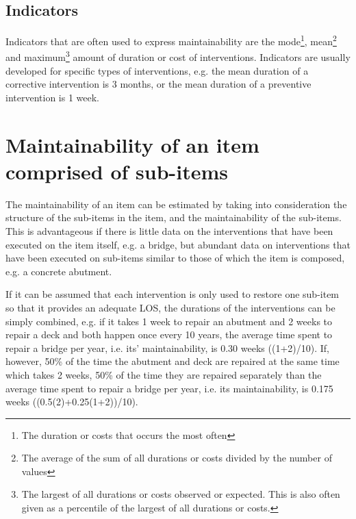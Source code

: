 \subsection{Indicators}
Indicators that are often used to express maintainability are the
mode\footnote{The duration or costs that occurs the most often},
mean\footnote{The average of the sum of all durations or costs divided by the
number of values} and maximum\footnote{The largest of all durations or costs
observed or expected. This is also often given as a percentile of the largest of
all durations or costs.} amount of duration or cost of interventions. Indicators
are usually developed for specific types of interventions, e.g. the mean duration
of a corrective intervention is 3 months, or the mean duration of a preventive
intervention is 1 week.
\section{Maintainability of an item comprised of sub-items}
The maintainability of an item can be estimated by taking into consideration the
structure of the sub-items in the item, and the maintainability of the sub-items.
This is advantageous if there is little data on the interventions that have been
executed on the item itself, e.g. a bridge, but abundant data on interventions
that have been executed on sub-items similar to those of which the item is
composed, e.g. a concrete abutment.

If it can be assumed that each intervention is only used to restore one sub-item
so that it provides an adequate LOS, the durations of the interventions can be
simply combined, e.g. if it takes 1 week to repair an abutment and 2 weeks to
repair a deck and both happen once every 10 years, the average time spent to
repair a bridge per year, i.e. its' maintainability, is 0.30 weeks ((1+2)/10).
If, however, 50\% of the time the abutment and deck are repaired at the same time
which takes 2 weeks, 50\% of the time they are repaired separately than the
average time spent to repair a bridge per year, i.e. its maintainability, is
0.175 weeks ((0.5(2)+0.25(1+2))/10).

